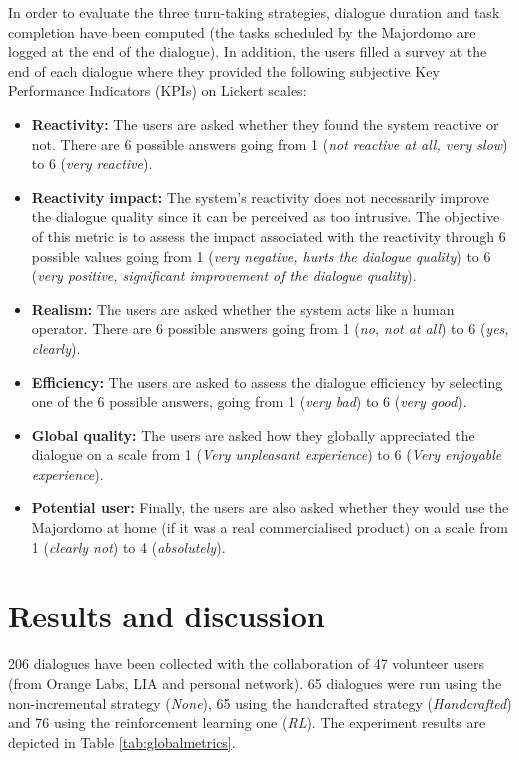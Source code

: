 		In order to evaluate the three turn-taking strategies, dialogue duration and task completion have been computed (the tasks scheduled by the Majordomo are logged at the end of the dialogue). In addition, the users filled a survey at the end of each dialogue where they provided the following subjective Key Performance Indicators (KPIs) on Lickert scales:
		
		\begin{itemize}
			\item \textbf{Reactivity:} The users are asked whether they found the system reactive or not. There are 6 possible answers going from 1 (\textit{not reactive at all, very slow}) to 6 (\textit{very reactive}).
			\item \textbf{Reactivity impact:} The system's reactivity does not necessarily improve the dialogue quality since it can be perceived as too intrusive. The objective of this metric is to assess the impact associated with the reactivity through 6 possible values going from 1 (\textit{very negative, hurts the dialogue quality}) to 6 (\textit{very positive, significant improvement of the dialogue quality}).
			\item \textbf{Realism:} The users are asked whether the system acts like a human operator. There are 6 possible answers going from 1 (\textit{no, not at all}) to 6 (\textit{yes, clearly}).
			\item \textbf{Efficiency:} The users are asked to assess the dialogue efficiency by selecting one of the 6 possible answers, going from 1 (\textit{very bad}) to 6 (\textit{very good}).
			\item \textbf{Global quality:} The users are asked how they globally appreciated the dialogue on a scale from 1 (\textit{Very unpleasant experience}) to 6 (\textit{Very enjoyable experience}).
			\item \textbf{Potential user:} Finally, the users are also asked whether they would use the Majordomo at home (if it was a real commercialised product) on a scale from 1 (\textit{clearly not}) to 4 (\textit{absolutely}).
		\end{itemize}


\section{Results and discussion}

	206 dialogues have been collected with the collaboration of 47 volunteer users (from Orange Labs, LIA and personal network). 65 dialogues were run using the non-incremental strategy (\textit{None}), 65 using the handcrafted strategy (\textit{Handcrafted}) and 76 using the reinforcement learning one (\textit{RL}). The experiment results are depicted in Table \ref{tab:globalmetrics}.

